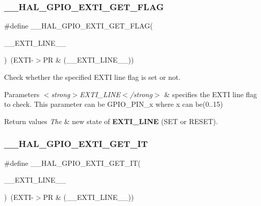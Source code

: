 \subsubsection{\texorpdfstring{\+\_\+\+\_\+\+H\+A\+L\+\_\+\+G\+P\+I\+O\+\_\+\+E\+X\+T\+I\+\_\+\+G\+E\+T\+\_\+\+F\+L\+AG}{\_\_HAL\_GPIO\_EXTI\_GET\_FLAG}}
{\footnotesize\ttfamily \#define \+\_\+\+\_\+\+H\+A\+L\+\_\+\+G\+P\+I\+O\+\_\+\+E\+X\+T\+I\+\_\+\+G\+E\+T\+\_\+\+F\+L\+AG(\begin{DoxyParamCaption}\item[{}]{\+\_\+\+\_\+\+E\+X\+T\+I\+\_\+\+L\+I\+N\+E\+\_\+\+\_\+ }\end{DoxyParamCaption})~(E\+X\+TI-\/$>$PR \& (\+\_\+\+\_\+\+E\+X\+T\+I\+\_\+\+L\+I\+N\+E\+\_\+\+\_\+))}



Check whether the specified E\+X\+TI line flag is set or not. 


\begin{DoxyParams}{Parameters}
{\em $<$strong$>$\+E\+X\+T\+I\+\_\+\+L\+I\+N\+E$<$/strong$>$} & specifies the E\+X\+TI line flag to check. This parameter can be G\+P\+I\+O\+\_\+\+P\+I\+N\+\_\+x where x can be(0..15) \\
\hline
\end{DoxyParams}

\begin{DoxyRetVals}{Return values}
{\em The} & new state of {\bfseries E\+X\+T\+I\+\_\+\+L\+I\+NE} (S\+ET or R\+E\+S\+ET). \\
\hline
\end{DoxyRetVals}
\mbox{\label{group___g_p_i_o___exported___macros_ga27f0e1f6c38745169d74620f6a178a94}} 
\subsubsection{\texorpdfstring{\+\_\+\+\_\+\+H\+A\+L\+\_\+\+G\+P\+I\+O\+\_\+\+E\+X\+T\+I\+\_\+\+G\+E\+T\+\_\+\+IT}{\_\_HAL\_GPIO\_EXTI\_GET\_IT}}
{\footnotesize\ttfamily \#define \+\_\+\+\_\+\+H\+A\+L\+\_\+\+G\+P\+I\+O\+\_\+\+E\+X\+T\+I\+\_\+\+G\+E\+T\+\_\+\+IT(\begin{DoxyParamCaption}\item[{}]{\+\_\+\+\_\+\+E\+X\+T\+I\+\_\+\+L\+I\+N\+E\+\_\+\+\_\+ }\end{DoxyParamCaption})~(E\+X\+TI-\/$>$PR \& (\+\_\+\+\_\+\+E\+X\+T\+I\+\_\+\+L\+I\+N\+E\+\_\+\+\_\+))}



